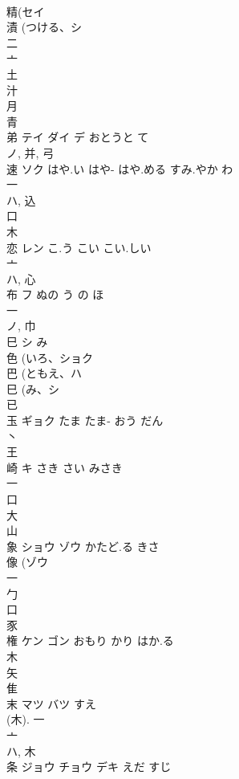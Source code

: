 \documentclass[8pt]{extreport}
\begin{document}
\begin{CJK}{UTF8}{min}
\\	精(セイ 
\\	漬 (つける、シ 
\\	二 
\\	亠 
\\	土 
\\	汁 
\\	月 
\\	青 
\\	弟	テイ ダイ デ	おとうと て	
\\	ノ, 并, 弓 
\\	速	ソク	はや.い はや- はや.める すみ.やか わ	
\\	一 
\\	ハ, 込 
\\	口 
\\	木 
\\	恋	レン	こ.う こい こい.しい	
\\	亠 
\\	ハ, 心 
\\	布	フ	ぬの う の ほ	
\\	一 
\\	ノ, 巾 
\\	巳	シ	み	
\\	色 (いろ、ショク 
\\	巴 (ともえ、ハ 
\\	巳 (み、シ 
\\	已 
\\	玉	ギョク	たま たま- おう だん	
\\	丶 
\\	王 
\\	崎	キ	さき さい みさき	
\\	一 
\\	口 
\\	大 
\\	山 
\\	象	ショウ ゾウ	かたど.る きさ	
\\	像 (ゾウ 
\\	一 
\\	勹 
\\	口 
\\	豕 
\\	権	ケン ゴン	おもり かり はか.る	
\\	木 
\\	矢 
\\	隹 
\\	末	マツ バツ	すえ	
\\	(木).			一 
\\	亠 
\\	ハ, 木 
\\	条	ジョウ チョウ デキ	えだ すじ	

\end{CJK}
\end{document}
